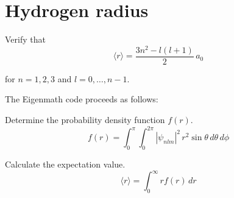 

\section*{Hydrogen radius}

Verify that
\begin{equation*}
\langle r\rangle=\frac{3n^2-l(l+1)}{2}\,a_0
\tag{1}
\end{equation*}

for $n=1,2,3$ and $l=0,\ldots,n-1$.

\bigskip
The Eigenmath code proceeds as follows:

\bigskip
Determine the probability density function $f(r)$.
\begin{equation*}
f(r)=\int_0^\pi\int_0^{2\pi}|\psi_{nlm}|^2\,r^2\sin\theta\,d\theta\,d\phi
\end{equation*}

Calculate the expectation value.
\begin{equation*}
\langle r\rangle=\int_0^\infty rf(r)\,dr
\end{equation*}


